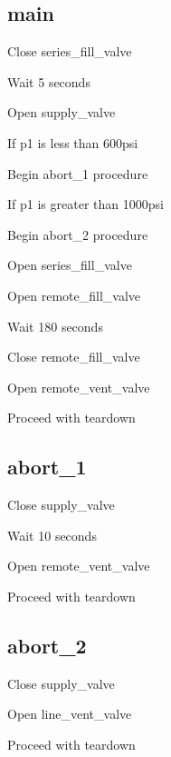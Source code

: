 \subsection{main}
\begin{checklist}
    \item \PRIMARY{} Close series\_fill\_valve
    \item Wait 5 seconds
    \item \PRIMARY{} Open supply\_valve
    \item If p1 is less than 600psi
    \begin{checklist}
        \item Begin abort\_1 procedure
    \end{checklist}
    \item If p1 is greater than 1000psi
    \begin{checklist}
        \item Begin abort\_2 procedure
    \end{checklist}
    \item \PRIMARY{} Open series\_fill\_valve
    \item \PRIMARY{} Open remote\_fill\_valve
    \item Wait 180 seconds
    \item \PRIMARY{} Close remote\_fill\_valve
    \item \PRIMARY{} Open remote\_vent\_valve
    \item \OPS{} Proceed with teardown
\end{checklist}

\subsection{abort\_1}
\begin{checklist}
    \item \SECONDARY{} Close supply\_valve
    \item Wait 10 seconds
    \item \SECONDARY{} Open remote\_vent\_valve
    \item \OPS{} Proceed with teardown
\end{checklist}

\subsection{abort\_2}
\begin{checklist}
    \item \CONTROL{} Close supply\_valve
    \item \CONTROL{} Open line\_vent\_valve
    \item \OPS{} Proceed with teardown
\end{checklist}
